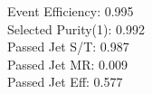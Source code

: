 Event Efficiency:   0.995\\ 
Selected Purity(1): 0.992\\ 
Passed Jet S/T:     0.987\\ 
Passed Jet MR:      0.009\\ 
Passed Jet Eff:     0.577